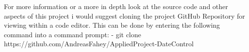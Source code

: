 For more information or a more in depth look at the source code and other aspects of this project i would suggest cloning the project GitHub Repository for viewing within a code editor. This can be done by entering the following command into a command prompt:
\newline
- git clone https://github.com/AndreasFahey/AppliedProject-DateControl
\newline



